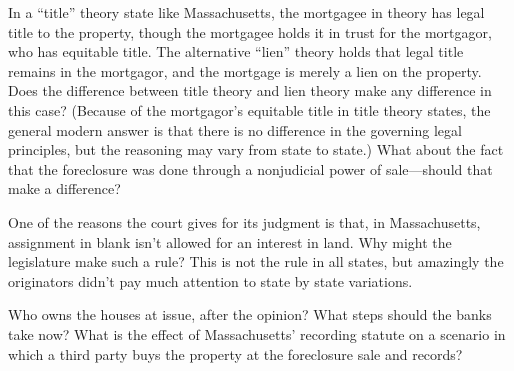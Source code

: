 
\item In a ``title'' theory state like Massachusetts, the mortgagee in theory
has legal title to the property, though the mortgagee holds it in trust for the
mortgagor, who has equitable title. The alternative ``lien'' theory holds that
legal title remains in the mortgagor, and the mortgage is merely a lien on the
property. Does the difference between title theory and lien theory make any
difference in this case? (Because of the mortgagor's equitable title in title
theory states, the general modern answer is that there is no difference in the
governing legal principles, but the reasoning may vary from state to state.) 
What about the fact that the foreclosure was done through a nonjudicial power
of sale---should that make a difference?


\item One of the reasons the court gives for its judgment is that, in
Massachusetts, assignment in blank isn't allowed for an interest in land. Why
might the legislature make such a rule? This is not the rule in all states,
but amazingly the originators didn't pay much attention to state by state
variations. 


\item Who owns the houses at issue, after the opinion? What steps should the
banks take now? What is the effect of Massachusetts' recording statute on a
scenario in which a third party buys the property at the foreclosure sale and
records?



